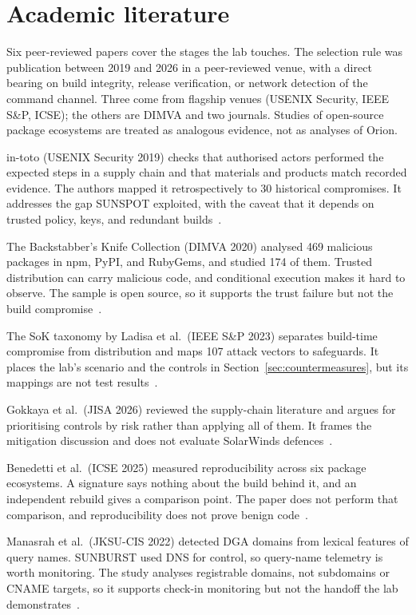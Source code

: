 \section{Academic literature}
\label{sec:literature}

Six peer-reviewed papers cover the stages the lab touches. The selection rule was publication between 2019 and 2026 in a peer-reviewed venue, with a direct bearing on build integrity, release verification, or network detection of the command channel. Three come from flagship venues (USENIX Security, IEEE S\&P, ICSE); the others are DIMVA and two journals. Studies of open-source package ecosystems are treated as analogous evidence, not as analyses of Orion.

in-toto (USENIX Security 2019) checks that authorised actors performed the expected steps in a supply chain and that materials and products match recorded evidence. The authors mapped it retrospectively to 30 historical compromises. It addresses the gap SUNSPOT exploited, with the caveat that it depends on trusted policy, keys, and redundant builds~\cite{intoto}.

The Backstabber's Knife Collection (DIMVA 2020) analysed 469 malicious packages in npm, PyPI, and RubyGems, and studied 174 of them. Trusted distribution can carry malicious code, and conditional execution makes it hard to observe. The sample is open source, so it supports the trust failure but not the build compromise~\cite{backstabber}.

The SoK taxonomy by Ladisa et al.\ (IEEE S\&P 2023) separates build-time compromise from distribution and maps 107 attack vectors to safeguards. It places the lab's scenario and the controls in Section~\ref{sec:countermeasures}, but its mappings are not test results~\cite{sok-taxonomy}.

Gokkaya et al.\ (JISA 2026) reviewed the supply-chain literature and argues for prioritising controls by risk rather than applying all of them. It frames the mitigation discussion and does not evaluate SolarWinds defences~\cite{gokkaya}.

Benedetti et al.\ (ICSE 2025) measured reproducibility across six package ecosystems. A signature says nothing about the build behind it, and an independent rebuild gives a comparison point. The paper does not perform that comparison, and reproducibility does not prove benign code~\cite{reproducible}.

Manasrah et al.\ (JKSU-CIS 2022) detected DGA domains from lexical features of query names. SUNBURST used DNS for control, so query-name telemetry is worth monitoring. The study analyses registrable domains, not subdomains or CNAME targets, so it supports check-in monitoring but not the handoff the lab demonstrates~\cite{dga-detection}.

